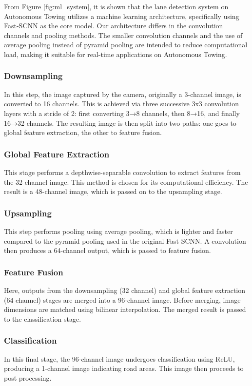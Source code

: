 \documentclass[conference]{IEEEtran}
\begin{document}
From Figure \ref{fig:ml_system}, it is shown that the lane detection system on Autonomous Towing utilizes a machine learning architecture, specifically using Fast-SCNN \cite{ref_fast_scnn} as the core model. Our architecture differs in the convolution channels and pooling methods. The smaller convolution channels and the use of average pooling instead of pyramid pooling are intended to reduce computational load, making it suitable for real-time applications on Autonomous Towing.

\subsubsection{Downsampling} 
In this step, the image captured by the camera, originally a 3-channel image, is converted to 16 channels. This is achieved via three successive 3x3 convolution layers with a stride of 2: first converting 3→8 channels, then 8→16, and finally 16→32 channels. The resulting image is then split into two paths: one goes to global feature extraction, the other to feature fusion. 

\subsubsection{Global Feature Extraction}
This stage performs a depthwise-separable convolution to extract features from the 32-channel image. This method is chosen for its computational efficiency. The result is a 48-channel image, which is passed on to the upsampling stage. 

\subsubsection{Upsampling}
This step performs pooling using average pooling, which is lighter and faster compared to the pyramid pooling used in the original Fast-SCNN. A convolution then produces a 64-channel output, which is passed to feature fusion.

\subsubsection{Feature Fusion}
Here, outputs from the downsampling (32 channel) and global feature extraction (64 channel) stages are merged into a 96-channel image. Before merging, image dimensions are matched using bilinear interpolation. The merged result is passed to the classification stage.

\subsubsection{Classification}
In this final stage, the 96-channel image undergoes classification using ReLU, producing a 1-channel image indicating road areas. This image then proceeds to post processing.
\end{document}
